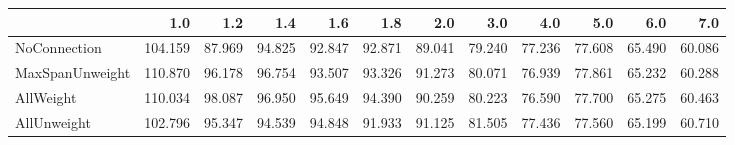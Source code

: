 \begin{tabular}{lrrrrrrrrrrr}
\toprule
{} &     1.0 &    1.2 &    1.4 &    1.6 &    1.8 &    2.0 &    3.0 &    4.0 &    5.0 &    6.0 &    7.0 \\
\midrule
NoConnection    & 104.159 & 87.969 & 94.825 & 92.847 & 92.871 & 89.041 & 79.240 & 77.236 & 77.608 & 65.490 & 60.086 \\
MaxSpanUnweight & 110.870 & 96.178 & 96.754 & 93.507 & 93.326 & 91.273 & 80.071 & 76.939 & 77.861 & 65.232 & 60.288 \\
AllWeight       & 110.034 & 98.087 & 96.950 & 95.649 & 94.390 & 90.259 & 80.223 & 76.590 & 77.700 & 65.275 & 60.463 \\
AllUnweight     & 102.796 & 95.347 & 94.539 & 94.848 & 91.933 & 91.125 & 81.505 & 77.436 & 77.560 & 65.199 & 60.710 \\
\bottomrule
\end{tabular}
